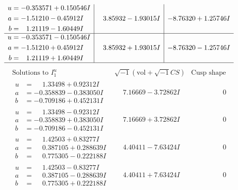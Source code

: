 \documentclass[1p]{elsarticle_modified}
\theoremstyle{definition}
\newcommand{\I}{\sqrt{-1}}
\begin{document}
$$\begin{array}{c|c|c}
\begin{aligned}
u &= -0.353571 + 0.150546 I \\
a &= -1.51210 - 0.45912 I \\
b &= \phantom{-}1.21119 - 1.60449 I\end{aligned}
 & \phantom{-}3.85932 - 1.93015 I & -8.76320 + 1.25746 I \\ \hline\begin{aligned}
u &= -0.353571 - 0.150546 I \\
a &= -1.51210 + 0.45912 I \\
b &= \phantom{-}1.21119 + 1.60449 I\end{aligned}
 & \phantom{-}3.85932 + 1.93015 I & -8.76320 - 1.25746 I\\
 \hline 
 \end{array}$$\newpage$$\begin{array}{c|c|c}  
\text{Solutions to }I^u_{1}& \I (\text{vol} + \sqrt{-1}CS) & \text{Cusp shape}\\
 \hline 
\begin{aligned}
u &= \phantom{-}1.33498 + 0.92312 I \\
a &= -0.358839 - 0.383050 I \\
b &= -0.709186 + 0.452131 I\end{aligned}
 & \phantom{-}7.16669 - 3.72862 I & \phantom{-0.000000 } 0 \\ \hline\begin{aligned}
u &= \phantom{-}1.33498 - 0.92312 I \\
a &= -0.358839 + 0.383050 I \\
b &= -0.709186 - 0.452131 I\end{aligned}
 & \phantom{-}7.16669 + 3.72862 I & \phantom{-0.000000 } 0 \\ \hline\begin{aligned}
u &= \phantom{-}1.42503 + 0.83277 I \\
a &= \phantom{-}0.387105 + 0.288639 I \\
b &= \phantom{-}0.775305 - 0.222188 I\end{aligned}
 & \phantom{-}4.40411 - 7.63424 I & \phantom{-0.000000 } 0 \\ \hline\begin{aligned}
u &= \phantom{-}1.42503 - 0.83277 I \\
a &= \phantom{-}0.387105 - 0.288639 I \\
b &= \phantom{-}0.775305 + 0.222188 I\end{aligned}
 & \phantom{-}4.40411 + 7.63424 I & \phantom{-0.000000 } 0 \\ \hline\begin{aligned}

\end{aligned}
\end{array}$$
\end{document}
